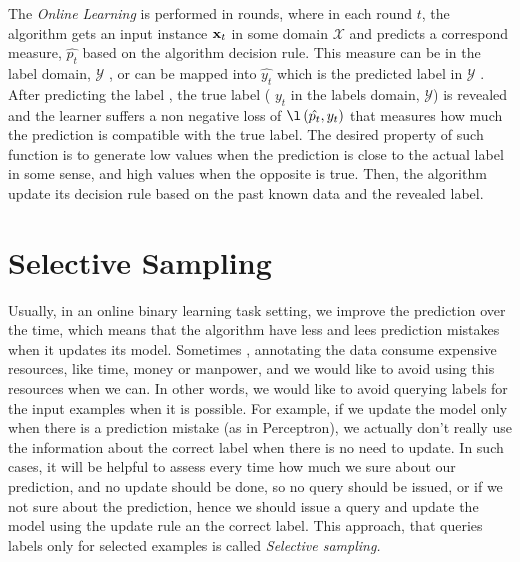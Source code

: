 %


The \textit{Online Learning} is performed in rounds, where in each round $t$, 
the algorithm gets an input instance $\mathbf{x}_{t}$ in some domain $\mathcal{X}$  and predicts a  correspond 
measure, $\hat{p_t}$ based on the algorithm decision  rule. This measure can be in the label domain, 
$\mathcal{Y}$ , or can be mapped into $\hat{y_t}$ which is the predicted label in $\mathcal{Y}$ .   
After predicting the label , the true label ( $y_t$ in the labels domain, $\mathcal{Y}$)  is revealed 
and the learner suffers a non negative loss of $\l\paren{\hat{p_t},y_t}$ that measures how much the 
prediction is compatible with the true label. The desired property of such function is to generate low 
values when the prediction is close to the actual label in some sense, and high values when the opposite 
is true. Then, the algorithm update its decision rule based on the past known data and the revealed label. 

\section{Selective Sampling}
\label{sec:selective_sampling}

Usually, in an  online binary learning task setting,  we improve the prediction over the time, 
which means that the algorithm  have less and lees prediction mistakes when it updates its model. 
Sometimes , annotating the data consume expensive resources, like time, money or manpower, 
and we would like to avoid using this resources when we can. In other words, we would like 
to avoid querying labels for the input examples when it is possible. For example, if we  update the 
model only when there is a prediction mistake (as in Perceptron), we actually don't really 
use the information about the correct label when there is no need to update. In such cases, 
it will be helpful to assess every time how much we sure about our prediction, and no update should be done, 
so no query should be issued, or if we not sure about the prediction, hence we should issue a 
query and update the model using the update rule an the correct label. 
This approach, that queries labels only for selected examples is called \textit{Selective sampling.}

